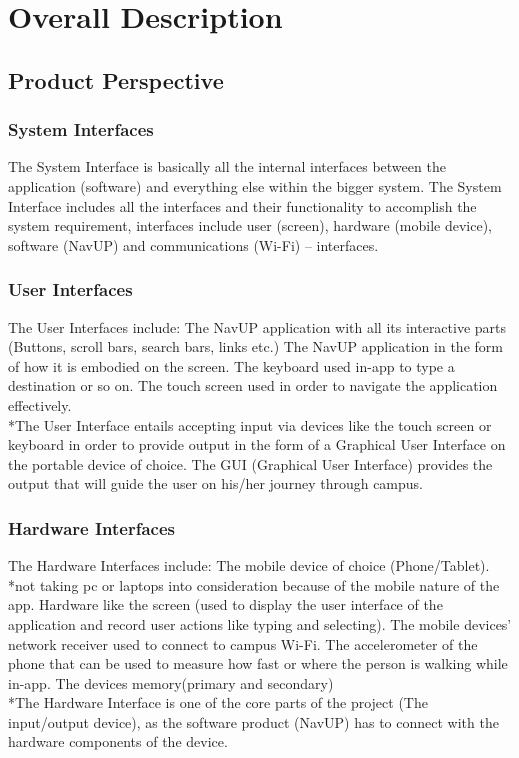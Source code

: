 \documentclass[11pt]{article}
\begin{document}
\section{Overall Description}
\subsection{Product Perspective}

\subsubsection{System Interfaces}
The System Interface is basically all the internal interfaces between the application (software) and everything else within the bigger system.
The System Interface includes all the interfaces and their functionality to accomplish the system requirement, interfaces include user (screen), hardware (mobile device), software (NavUP) and communications (Wi-Fi) – interfaces.

\subsubsection{User Interfaces}
The User Interfaces include:
The NavUP application with all its interactive parts (Buttons, scroll bars, search bars, links etc.)
The NavUP application in the form of how it is embodied on the screen.
The keyboard used in-app to type a destination or so on.
The touch screen used in order to navigate the application effectively.\\
*The User Interface entails accepting input via devices like the touch screen or keyboard in order to provide output in the form of a Graphical User Interface on the portable device of choice. The GUI (Graphical User Interface) provides the output that will guide the user on his/her journey through campus. 

\subsubsection{Hardware Interfaces}
The Hardware Interfaces include:
The mobile device of choice (Phone/Tablet).
*not taking pc or laptops into consideration because of the mobile nature of the app.
Hardware like the screen (used to display the user interface of the application and record user actions like typing and selecting).
The mobile devices’ network receiver used to connect to campus Wi-Fi.
The accelerometer of the phone that can be used to measure how fast or where the person is walking while in-app.
The devices memory(primary and secondary)\\
*The Hardware Interface is one of the core parts of the project (The input/output device), as the software product (NavUP) has to connect with the hardware components of the device. 
\end{document}

